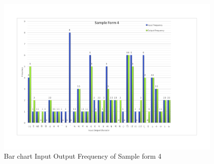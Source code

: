 \begin{figure}[H]
\centering
\includegraphics[width=1\textwidth]{Bform4.pdf}
\caption {Bar chart Input Output Frequency of Sample form 4}
\label {fig:Bbar4}
\end{figure}


